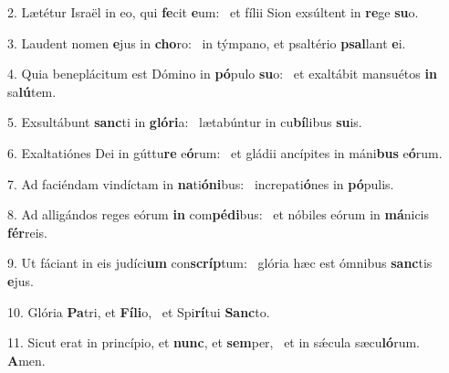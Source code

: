 2. Lætétur Israël in eo, qui \textbf{fe}cit \textbf{e}um: \ast\  et fílii Sion exsúltent in \textbf{re}ge \textbf{su}o.\

3. Laudent nomen \textbf{e}jus in \textbf{cho}ro: \ast\  in týmpano, et psaltério \textbf{psal}lant \textbf{e}i.\

4. Quia beneplácitum est Dómino in \textbf{pó}pulo \textbf{su}o: \ast\  et exaltábit mansuétos \textbf{in} sa\textbf{lú}tem.\

5. Exsultábunt \textbf{sanc}ti in \textbf{gló}\textbf{ri}a: \ast\  lætabúntur in cu\textbf{bí}libus \textbf{su}is.\

6. Exaltatiónes Dei in gúttu\textbf{re} e\textbf{ó}rum: \ast\  et gládii ancípites in máni\textbf{bus} e\textbf{ó}rum.\

7. Ad faciéndam vindíctam in \textbf{na}ti\textbf{ó}\textbf{ni}bus: \ast\  increpati\textbf{ó}nes in \textbf{pó}pulis.\

8. Ad alligándos reges eórum \textbf{in} com\textbf{pé}\textbf{di}bus: \ast\  et nóbiles eórum in \textbf{má}nicis \textbf{fér}reis.\

9. Ut fáciant in eis judíci\textbf{um} con\textbf{scríp}tum: \ast\  glória hæc est ómnibus \textbf{sanc}tis \textbf{e}jus.\

10. Glória \textbf{Pa}tri, et \textbf{Fí}\textbf{li}o, \ast\  et Spi\textbf{rí}tui \textbf{Sanc}to.\

11. Sicut erat in princípio, et \textbf{nunc}, et \textbf{sem}per, \ast\  et in sǽcula sæcu\textbf{ló}rum. \textbf{A}men.\

